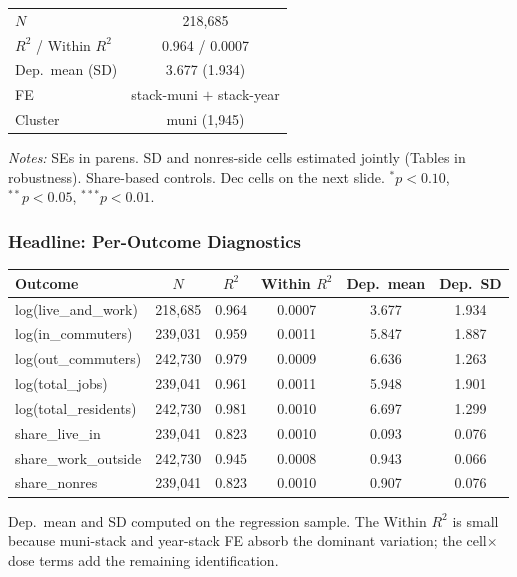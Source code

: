 \documentclass[xcolor = x11names, compress, aspectratio = 169]{beamer}
\begin{document}
\begin{frame}
\begin{tabular}{lccc}
            \quad $N$ & \multicolumn{3}{c}{218{,}685} \\
            \quad $R^2$ / Within $R^2$ & \multicolumn{3}{c}{0.964 / 0.0007} \\
            \quad Dep.\ mean (SD) & \multicolumn{3}{c}{3.677 (1.934)} \\
            \quad FE & \multicolumn{3}{c}{stack-muni $+$ stack-year} \\
            \quad Cluster & \multicolumn{3}{c}{muni (1{,}945)} \\
            \bottomrule
        \end{tabular}
        \vspace{0.05cm}
        \begin{minipage}{0.95\textwidth}
            \tiny \textit{Notes:} SEs in parens. SD and nonres-side cells
            estimated jointly (Tables in robustness). Share-based controls.
            Dec cells on the next slide.
            $^{*}p<0.10$, $^{**}p<0.05$, $^{***}p<0.01$.
        \end{minipage}
    \end{frame}

    \begin{frame}
    \frametitle{Headline: Per-Outcome Diagnostics}
        \centering
        \scriptsize
        \renewcommand{\arraystretch}{1.10}
        \setlength{\tabcolsep}{6pt}
        \begin{tabular}{lccccc}
            \toprule
            Outcome & $N$ & $R^2$ & Within $R^2$ & Dep.\ mean & Dep.\ SD \\
            \midrule
            log(live\_and\_work)    & 218{,}685 & 0.964 & 0.0007 & 3.677 & 1.934 \\
            log(in\_commuters)      & 239{,}031 & 0.959 & 0.0011 & 5.847 & 1.887 \\
            log(out\_commuters)     & 242{,}730 & 0.979 & 0.0009 & 6.636 & 1.263 \\
            log(total\_jobs)        & 239{,}041 & 0.961 & 0.0011 & 5.948 & 1.901 \\
            log(total\_residents)   & 242{,}730 & 0.981 & 0.0010 & 6.697 & 1.299 \\
            share\_live\_in         & 239{,}041 & 0.823 & 0.0010 & 0.093 & 0.076 \\
            share\_work\_outside    & 242{,}730 & 0.945 & 0.0008 & 0.943 & 0.066 \\
            share\_nonres           & 239{,}041 & 0.823 & 0.0010 & 0.907 & 0.076 \\
            \bottomrule
        \end{tabular}
        \vspace{0.10cm}
        \footnotesize
        Dep.\ mean and SD computed on the regression sample. The Within $R^2$
        is small because muni-stack and year-stack FE absorb the dominant
        variation; the cell$\times$dose terms add the remaining identification.
    \end{frame}
\end{document}

